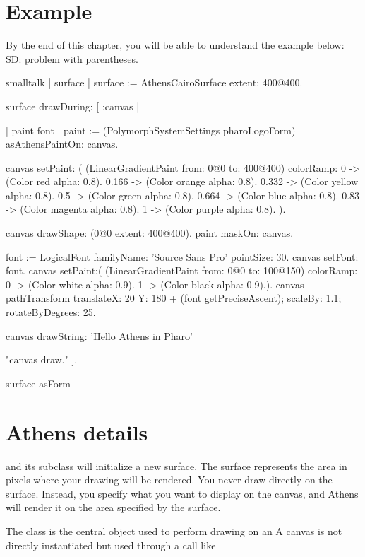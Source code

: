 \documentclass[10pt,twoside,english]{_support/latex/sbabook/sbabook}
\begin{document}
\section{Example}
By the end of this chapter, you will be able to understand the example below:
SD: problem with parentheses.
\begin{displaycode}{smalltalk}
| surface |
surface := AthensCairoSurface   extent: 400@400.

surface drawDuring: [ :canvas | 

	| paint font |
	paint := (PolymorphSystemSettings pharoLogoForm) asAthensPaintOn: canvas.
 
	canvas setPaint: (
		 (LinearGradientPaint from: 0@0  to: 400@400) 
			 colorRamp: {  
			  0 -> (Color red alpha: 0.8).
			  0.166 -> (Color orange alpha: 0.8).
			  0.332 -> (Color yellow alpha: 0.8).
			  0.5 -> (Color green alpha: 0.8).
			  0.664 -> (Color blue alpha: 0.8).
			  0.83 -> (Color magenta alpha: 0.8).
			  1 -> (Color purple alpha: 0.8). 
		 }).

canvas drawShape: (0@0 extent: 400@400). 
paint maskOn: canvas.
 
font := LogicalFont familyName: 'Source Sans Pro' pointSize: 30.
canvas setFont: font.
canvas setPaint:(  (LinearGradientPaint from: 0@0  to: 100@150)
 colorRamp: {  
  0 -> (Color white alpha: 0.9).
  1 -> (Color black alpha: 0.9).}).
canvas pathTransform translateX: 20 Y: 180 + (font getPreciseAscent); scaleBy: 1.1; rotateByDegrees: 25.

canvas drawString: 'Hello Athens in Pharo'

"canvas draw."
].

surface asForm
\end{displaycode}

\section{Athens details}
 and its subclass  will initialize a new surface.
The surface represents the area in pixels where your drawing will be rendered. You
never draw directly on the surface. Instead, you specify what you want to display
on the canvas, and Athens will render it on the area specified by the surface.

The class  is the central object used to perform drawing on an 
A canvas is not directly instantiated but used through a call like
\end{document}
